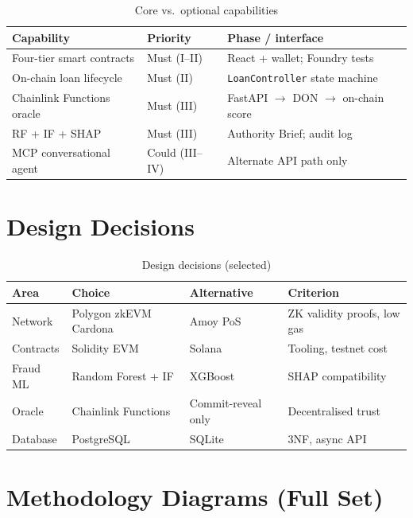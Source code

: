 \documentclass[12pt, a4paper]{report}
\newcommand{\tableheadcolor}{\rowcolor{TableHeadBg}}
\begin{document}
\begin{table}[H]
\centering
\caption[Core vs.\ optional capabilities]{Core vs.\ optional capabilities}
\label{tab:capability-priority}
\begin{tabular}{p{3.2cm}p{2.2cm}p{7.8cm}}
\toprule
\tableheadcolor
\textbf{Capability} & \textbf{Priority} & \textbf{Phase / interface} \\
\midrule
Four-tier smart contracts & Must (I--II) & React + wallet; Foundry tests \\
On-chain loan lifecycle & Must (II) & \texttt{LoanController} state machine \\
Chainlink Functions oracle & Must (III) & FastAPI $\to$ DON $\to$ on-chain score \\
RF + IF + SHAP & Must (III) & Authority Brief; audit log \\
MCP conversational agent & Could (III--IV) & Alternate API path only \\
\bottomrule
\end{tabular}
\end{table}

\section{Design Decisions}
\label{sec:design-decisions}
\label{sec:gnn-extension}
\label{sec:fl-fraud}
\label{sec:ml-workload}

\begin{table}[H]
\centering
\caption[Design decisions (selected)]{Design decisions (selected)}
\label{tab:design-decisions}
\footnotesize
\begin{tabular}{p{2.8cm}p{2.6cm}p{2.6cm}p{4.5cm}}
\toprule
\tableheadcolor
\textbf{Area} & \textbf{Choice} & \textbf{Alternative} & \textbf{Criterion} \\
\midrule
Network & Polygon zkEVM Cardona & Amoy PoS & ZK validity proofs, low gas \\
Contracts & Solidity EVM & Solana & Tooling, testnet cost \\
Fraud ML & Random Forest + IF & XGBoost & SHAP compatibility \\
Oracle & Chainlink Functions & Commit-reveal only & Decentralised trust \\
Database & PostgreSQL & SQLite & 3NF, async API \\
\bottomrule
\end{tabular}
\end{table}


\section{Methodology Diagrams (Full Set)}
\label{sec:methodology-figures}
\label{sec:llm-eval}
\label{sec:future-retail-payments}
\end{document}
